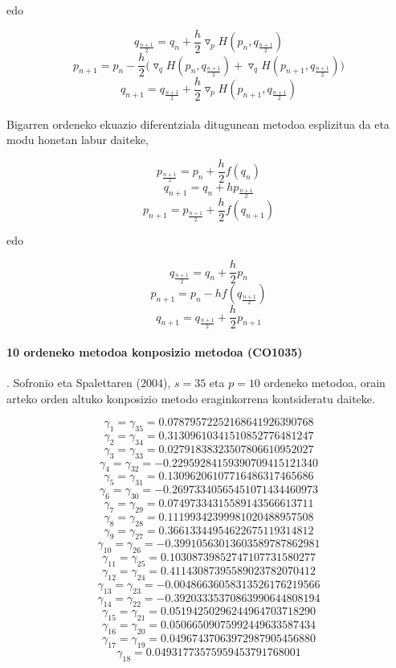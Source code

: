 edo

\[q_{\frac{n+1}{2}}=q_n+\frac{h}{2} \triangledown_p H(p_n,q_{\frac{n+1}{2}}) \]
\begin{equation}
p_{n+1}=p_n-\frac{h}{2} \big(\triangledown_q H(p_n,q_{\frac{n+1}{2}})+ \triangledown_q H(p_{n+1},q_{\frac{n+1}{2}}) \big)
\end{equation}
\[q_{n+1}=q_{\frac{n+1}{2}}+\frac{h}{2} \triangledown_p H(p_{n+1},q_{\frac{n+1}{2}}) \]


\paragraph*{}Bigarren ordeneko ekuazio diferentziala ditugunean metodoa esplizitua da eta modu honetan labur daiteke,

\[p_{\frac{n+1}{2}}=p_n+\frac{h}{2} f(q_n)\]
\begin{equation}
q_{n+1}=q_n+h p_{\frac{n+1}{2}}
\end{equation}
\[p_{n+1}=p_{\frac{n+1}{2}}+\frac{h}{2}f(q_{n+1})\]

edo

\[q_{\frac{n+1}{2}}=q_n+\frac{h}{2} p_n\]
\begin{equation}
p_{n+1}=p_n-h f(q_{\frac{n+1}{2}})
\end{equation}
\[q_{n+1}=q_{\frac{n+1}{2}}+\frac{h}{2} p_{n+1}\]


\paragraph*{\textbf{10 ordeneko metodoa konposizio metodoa (CO1035)}}.
Sofronio eta Spalettaren ($2004$), $s=35$ eta $p=10$ ordeneko metodoa, orain arteko orden altuko konposizio metodo eraginkorrena kontsideratu daiteke.

\[\gamma_1=\gamma_{35}= 0.07879572252168641926390768\] 
\[\gamma_2=\gamma_{34}= 0.31309610341510852776481247\] 
\[\gamma_3=\gamma_{33}= 0.02791838323507806610952027\]
\[\gamma_4=\gamma_{32}= -0.22959284159390709415121340\] 
\[\gamma_5=\gamma_{31}= 0.13096206107716486317465686\] 
\[\gamma_6=\gamma_{30}= -0.26973340565451071434460973\] 
\[\gamma_7=\gamma_{29}= 0.07497334315589143566613711\] 
\[\gamma_8=\gamma_{28}= 0.11199342399981020488957508\] 
\[\gamma_9=\gamma_{27}= 0.36613344954622675119314812\] 
\[\gamma_{10}=\gamma_{26}= -0.39910563013603589787862981\] 
\[\gamma_{11}=\gamma_{25}= 0.10308739852747107731580277\]
\[\gamma_{12}=\gamma_{24}= 0.41143087395589023782070412\] 
\[\gamma_{13}=\gamma_{23}= -0.00486636058313526176219566\] 
\[\gamma_{14}=\gamma_{22}= -0.39203335370863990644808194\] 
\[\gamma_{15}=\gamma_{21}= 0.05194250296244964703718290\] 
\[\gamma_{16}=\gamma_{20}= 0.05066509075992449633587434\] 
\[\gamma_{17}=\gamma_{19}= 0.04967437063972987905456880\] 
\[\gamma_{18}= 0.04931773575959453791768001\]  


